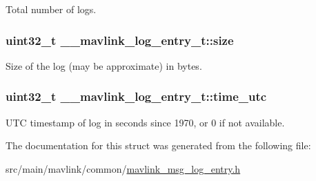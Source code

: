 Total number of logs. 

\hypertarget{struct____mavlink__log__entry__t_a5086cc006c4c5e8a6a0706635b6e4204}{
\subsubsection[{size}]{\setlength{\rightskip}{0pt plus 5cm}uint32\+\_\+t \+\_\+\+\_\+mavlink\+\_\+log\+\_\+entry\+\_\+t\+::size}}\label{struct____mavlink__log__entry__t_a5086cc006c4c5e8a6a0706635b6e4204}


Size of the log (may be approximate) in bytes. 

\hypertarget{struct____mavlink__log__entry__t_a88e5b3a71ebc3ee9da62331929dc50bc}{
\subsubsection[{time\+\_\+utc}]{\setlength{\rightskip}{0pt plus 5cm}uint32\+\_\+t \+\_\+\+\_\+mavlink\+\_\+log\+\_\+entry\+\_\+t\+::time\+\_\+utc}}\label{struct____mavlink__log__entry__t_a88e5b3a71ebc3ee9da62331929dc50bc}


U\+T\+C timestamp of log in seconds since 1970, or 0 if not available. 



The documentation for this struct was generated from the following file\+:\begin{DoxyCompactItemize}
\item 
src/main/mavlink/common/\hyperlink{mavlink__msg__log__entry_8h}{mavlink\+\_\+msg\+\_\+log\+\_\+entry.\+h}\end{DoxyCompactItemize}
